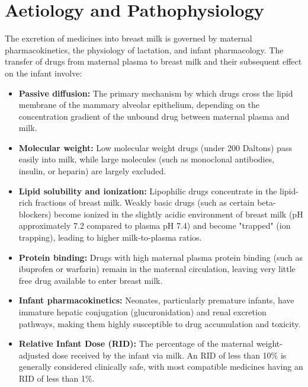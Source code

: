 \section*{Aetiology and Pathophysiology}
The excretion of medicines into breast milk is governed by maternal pharmacokinetics, the physiology of lactation, and infant pharmacology. The transfer of drugs from maternal plasma to breast milk and their subsequent effect on the infant involve:
\begin{itemize}
    \item \textbf{Passive diffusion:} The primary mechanism by which drugs cross the lipid membrane of the mammary alveolar epithelium, depending on the concentration gradient of the unbound drug between maternal plasma and milk.
    \item \textbf{Molecular weight:} Low molecular weight drugs (under 200 Daltons) pass easily into milk, while large molecules (such as monoclonal antibodies, insulin, or heparin) are largely excluded.
    \item \textbf{Lipid solubility and ionization:} Lipophilic drugs concentrate in the lipid-rich fractions of breast milk. Weakly basic drugs (such as certain beta-blockers) become ionized in the slightly acidic environment of breast milk (pH approximately 7.2 compared to plasma pH 7.4) and become "trapped" (ion trapping), leading to higher milk-to-plasma ratios.
    \item \textbf{Protein binding:} Drugs with high maternal plasma protein binding (such as ibuprofen or warfarin) remain in the maternal circulation, leaving very little free drug available to enter breast milk.
    \item \textbf{Infant pharmacokinetics:} Neonates, particularly premature infants, have immature hepatic conjugation (glucuronidation) and renal excretion pathways, making them highly susceptible to drug accumulation and toxicity.
    \item \textbf{Relative Infant Dose (RID):} The percentage of the maternal weight-adjusted dose received by the infant via milk. An RID of less than 10\% is generally considered clinically safe, with most compatible medicines having an RID of less than 1\%.
\end{itemize}

